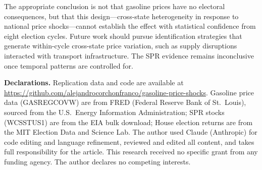 \documentclass[12pt]{article}
\begin{document}
The appropriate conclusion is not that gasoline prices have no electoral consequences, but that this design---cross-state heterogeneity in response to national price shocks---cannot establish the effect with statistical confidence from eight election cycles. Future work should pursue identification strategies that generate within-cycle cross-state price variation, such as supply disruptions interacted with transport infrastructure. The SPR evidence remains inconclusive once temporal patterns are controlled for.

\bigskip
\noindent\begingroup\footnotesize
\textbf{Declarations.} Replication data and code are available at \url{https://github.com/alejandrocorchonfranco/gasoline-price-shocks}. Gasoline price data (GASREGCOVW) are from FRED (Federal Reserve Bank of St.\ Louis), sourced from the U.S.\ Energy Information Administration; SPR stocks (WCSSTUS1) are from the EIA bulk download; House election returns are from the MIT Election Data and Science Lab. The author used Claude (Anthropic) for code editing and language refinement, reviewed and edited all content, and takes full responsibility for the article. This research received no specific grant from any funding agency. The author declares no competing interests.
\par\endgroup
\end{document}
